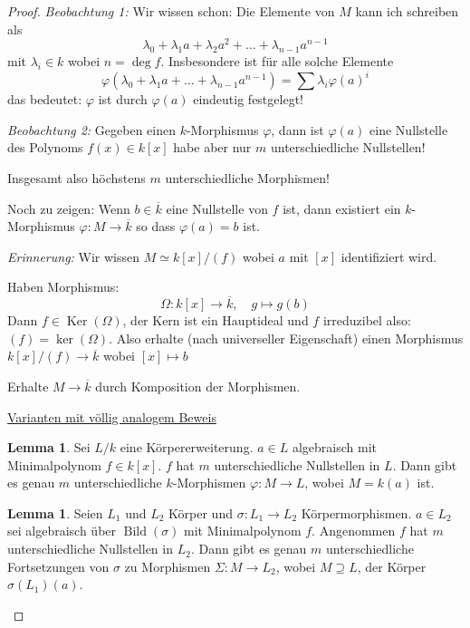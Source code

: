 \documentclass[12pt,parskip=full]{scrartcl}
\newcommand{\heading}{\underline}
\theoremstyle{definition}
\newtheorem{lemma}[theorem]{Lemma}
\theoremstyle{remark}
\begin{document}
	\begin{proof}
		\textit{Beobachtung 1:} Wir wissen schon: Die Elemente von $M$ kann ich schreiben als
		\begin{equation*}
			\lambda_0 + \lambda_1 a + \lambda_2 a^2 + \dots + \lambda_{n-1} a^{n-1}
		\end{equation*}
		mit $\lambda_i \in k$ wobei $n = \deg f$. Insbesondere ist für alle solche Elemente
		\begin{equation*}
			\varphi(\lambda_0 + \lambda_1 a + \dots + \lambda_{n-1} a^{n-1}) = \sum \lambda_i \varphi(a)^i
		\end{equation*}
		das bedeutet: $\varphi$ ist durch $\varphi(a)$ eindeutig festgelegt!
		
		\textit{Beobachtung 2:} Gegeben einen $k$-Morphismus $\varphi$, dann ist $\varphi(a)$ eine Nullstelle des Polynoms $f(x) \in k[x]$ habe aber nur $m$ unterschiedliche Nullstellen!
		
		Insgesamt also höchstens $m$ unterschiedliche Morphismen!
		
		Noch zu zeigen: Wenn $b \in \overline{k}$ eine Nullstelle von $f$ ist, dann existiert ein $k$-Morphismus $\varphi: M \to \overline{k}$ so dass $\varphi(a) = b$ ist.
		
		\textit{Erinnerung:} Wir wissen $M \simeq k[x]/(f)$ wobei $a$ mit $[x]$ identifiziert wird.
		
		Haben Morphismus:
		\begin{equation*}
			\Omega: k[x] \to \overline{k}, \quad g \mapsto g(b)
		\end{equation*}
		Dann $f \in \operatorname{Ker}(\Omega)$, der Kern ist ein Hauptideal und $f$ irreduzibel also: $(f) = \operatorname{ker}(\Omega)$. Also erhalte (nach universeller Eigenschaft) einen Morphismus $k[x]/(f) \to \overline{k}$ wobei $[x] \mapsto b$
		
		Erhalte $M \to \overline{k}$ durch Komposition der Morphismen.
		
		\heading{Varianten mit völlig analogem Beweis}
		
		\begin{lemma}
			Sei $L/k$ eine Körpererweiterung. $a \in L$ algebraisch mit Minimalpolynom $f \in k[x]$. $f$ hat $m$ unterschiedliche Nullstellen in $L$. Dann gibt es genau $m$ unterschiedliche $k$-Morphismen $\varphi: M \to L$, wobei $M = k(a)$ ist.
		\end{lemma}
	
		\begin{lemma}
			Seien $L_1$ und $L_2$ Körper und $\sigma: L_1 \to L_2$ Körpermorphismen. $a \in L_2$ sei algebraisch über $\operatorname{Bild}(\sigma)$ mit Minimalpolynom $f$. Angenommen $f$ hat $m$ unterschiedliche Nullstellen in $L_2$. Dann gibt es genau $m$ unterschiedliche Fortsetzungen von $\sigma$ zu Morphismen $\Sigma: M \to L_2$, wobei $M \supseteq L$, der Körper $\sigma(L_1)(a)$.
		\end{lemma}
	\end{proof}
\end{document}
